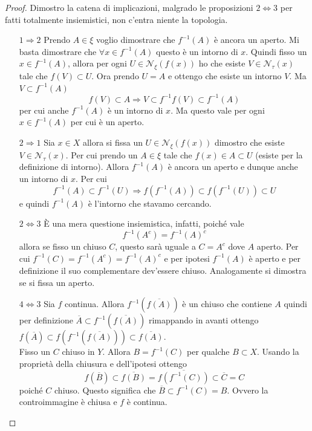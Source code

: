 \begin{proof}
	Dimostro la catena di implicazioni, malgrado le proposizioni $2 \Leftrightarrow 3$ per fatti totalmente insiemistici, non c'entra niente la topologia.
	\begin{enumerate}
		\item[$1 \Rightarrow 2$] Prendo $A \in \xi$ voglio dimostrare che $f^{-1}(A)$ è ancora un aperto. Mi basta dimostrare che $\forall x \in f^{-1}(A)$ questo è un intorno di $x$. Quindi fisso un $x \in f^{-1}(A)$, allora per ogni $U \in \mathcal{N}_\xi(f(x))$ ho che esiste $V \in \mathcal{N}_\tau(x)$ tale che $f(V) \subset U$. Ora prendo $U = A$ e ottengo che esiste un intorno $V$. Ma $V \subset f^{-1}(A)$
		\begin{equation*}
			f(V) \subset A \Longrightarrow V \subset f^{-1}f(V) \subset f^{-1}(A)
		\end{equation*}
		per cui anche $f^{-1}(A)$ è un intorno di $x$. Ma questo vale per ogni $x \in f^{-1}(A)$ per cui è un aperto.
		\item[$2 \Rightarrow 1$] Sia $x \in X$ allora si fissa un $U \in \mathcal{N}_\xi(f(x))$ dimostro che esiste $V \in \mathcal{N}_\tau(x)$. Per cui prendo un $A \in \xi$ tale che $f(x) \in A \subset U$ (esiste per la definizione di intorno). Allora $f^{-1}(A)$ è ancora un aperto e dunque anche un intorno di $x$. Per cui 
		\begin{equation*}
			f^{-1}(A) \subset f^{-1}(U) \Longrightarrow f(f^{-1}(A)) \subset f(f^{-1}(U)) \subset U
		\end{equation*}
		e quindi $f^{-1}(A)$ è l'intorno che stavamo cercando.
		\item[$2 \Leftrightarrow 3$] È una mera questione insiemistica, infatti, poiché vale 
		\begin{equation*}
			f^{-1}(A^c) = f^{-1}(A)^c
		\end{equation*}
		allora se fisso un chiuso $C$, questo sarà uguale a $C = A^c$ dove $A$ aperto. Per cui $f^{-1}(C) = f^{-1}(A^c) = f^{-1}(A)^c$ e per ipotesi $f^{-1}(A)$ è aperto e per definizione il suo complementare dev'essere chiuso. Analogamente si dimostra se si fissa un aperto.
		\item[$4 \Leftrightarrow 3$] Sia $f$ continua. Allora $f^{-1}(\overline{f(A)})$ è un chiuso che contiene $A$ quindi per definizione $\overline{A} \subset f^{-1}(\overline{f(A)})$ rimappando in avanti ottengo 
		$f(\overline{A}) \subset f(f^{-1}(\overline{f(A)})) 
		\subset \overline{f(A)}$.\\
		
		Fisso un $C$ chiuso in $Y$. Allora $B = f^{-1}(C)$ per qualche $B \subset X$. Usando la proprietà della chiusura e dell'ipotesi ottengo  
		\begin{equation}
			f(\overline{B}) \subset \overline{f(B)} = \overline{f(f^{-1}(C))} \subset \overline{C} = C
		\end{equation}
		poiché $C$ chiuso. Questo significa che $\overline{B} \subset f^{-1}(C) = B$. Ovvero la controimmagine è chiusa e $f$ è continua.
\end{enumerate}
\end{proof}

